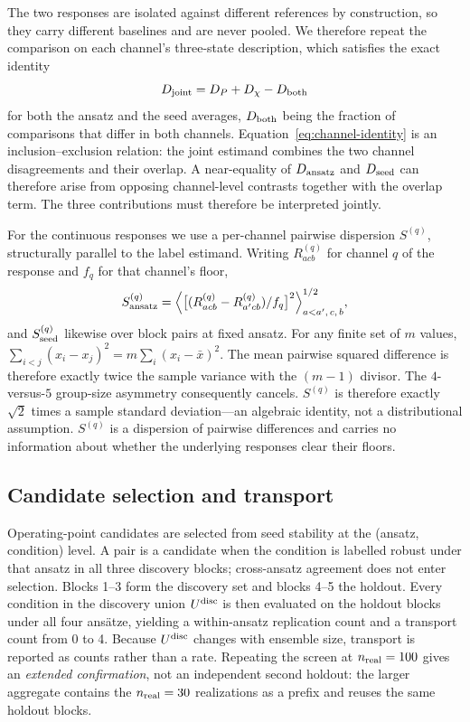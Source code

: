 \documentclass[aip,jap,reprint,superscriptaddress,longbibliography,floatfix]{revtex4-2}
\begin{document}
The two responses are isolated against different references by construction, so
they carry different baselines and are never pooled. We therefore repeat the
comparison on each channel's three-state description, which satisfies the
exact identity
\begin{equation}
D_{\rm joint} = D_{P} + D_{\chi} - D_{\rm both}
\label{eq:channel-identity}
\end{equation}
for both the ansatz and the seed averages, $D_{\rm both}$ being the fraction of
comparisons that differ in both channels. Equation~\eqref{eq:channel-identity} is an
inclusion--exclusion relation: the joint estimand combines the two channel
disagreements and their overlap. A near-equality of $D_{\rm ansatz}$ and
$D_{\rm seed}$ can therefore arise from opposing channel-level contrasts
together with the overlap term. The three contributions must therefore be
interpreted jointly.

For the continuous responses we use a per-channel pairwise dispersion
$S^{(q)}$, structurally parallel to the label estimand. Writing $R^{(q)}_{acb}$
for channel $q$ of the response and $f_q$ for that channel's floor,
%
\begin{equation}
S^{(q)}_{\rm ansatz} =
\Big\langle \big[(R^{(q)}_{acb}-R^{(q)}_{a'cb})/f_q\big]^2
\Big\rangle^{1/2}_{a<a',\,c,\,b},
\label{eq:S}
\end{equation}
%
and $S^{(q)}_{\rm seed}$ likewise over block pairs at fixed ansatz. For any finite set of $m$ values,
$\sum_{i<j}(x_i-x_j)^2 = m\sum_i(x_i-\bar{x})^2$. The mean pairwise squared
difference is therefore exactly twice the sample variance with the $(m-1)$
divisor. The $4$-versus-$5$ group-size asymmetry consequently cancels.
$S^{(q)}$ is therefore exactly $\sqrt{2}$ times a sample standard deviation---an
algebraic identity, not a distributional assumption. $S^{(q)}$ is a dispersion of pairwise differences and carries no
information about whether the underlying responses clear their floors.

\subsection{Candidate selection and transport}

Operating-point candidates are selected from seed stability at the
(ansatz, condition) level. A pair is a candidate when the condition is labelled
robust under that ansatz in all three discovery blocks; cross-ansatz agreement
does not enter selection. Blocks 1--3 form the discovery set and blocks 4--5
the holdout. Every condition in the discovery union $U^{\rm disc}$ is then
evaluated on the holdout blocks under all four ans\"atze, yielding a
within-ansatz replication count and a transport count from 0 to 4. Because
$U^{\rm disc}$ changes with ensemble size, transport is reported as counts
rather than a rate. Repeating the screen at $n_{\rm real}=100$ gives an
\emph{extended confirmation}, not an independent second holdout: the larger
aggregate contains the $n_{\rm real}=30$ realizations as a prefix and reuses
the same holdout blocks.
\end{document}
